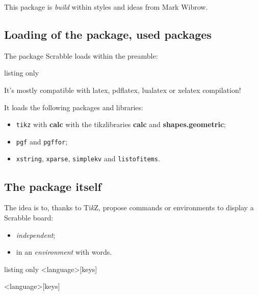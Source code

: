 \documentclass{article}
\newcommand\tikzlogo{Ti\textit{k}Z}
\let\TikZ\tikzlogo
\newcommand\Cle[1]{{\bfseries\sffamily\textlangle #1\textrangle}}
\begin{document}
\smallskip

This package is \textit{build} within styles and ideas from Mark Wibrow.

\subsection{Loading of the package, used packages}

The package \textsf{Scrabble} loads within the preamble:

\begin{PresentationCode}{listing only}
\usepackage{Scrabble}
\end{PresentationCode}

It's mostly compatible with \textsf{latex}, \textsf{pdflatex}, \textsf{lualatex} or \textsf{xelatex} compilation!

\medskip

It loads the following packages and libraries:

\begin{itemize}
	\item \texttt{tikz} with \Cle{calc} with the tikzlibraries \Cle{calc} and \Cle{shapes.geometric};
	\item \texttt{pgf} and \texttt{pgffor};
	\item \texttt{xstring}, \texttt{xparse}, \texttt{simplekv} and \texttt{listofitems}.
\end{itemize}

\subsection{The package itself}

The idea is to, thanks to \TikZ, propose commands or environments to display a Scrabble\texttrademark{} board:

\begin{itemize}
	\item \textit{independent};
	\item in an \textit{environment} with words.
\end{itemize}

\begin{PresentationCode}{listing only}
\ScrabbleBoard<language>[keys]

\begin{EnvScrabble}<language>[keys]
\end{EnvScrabble}
\end{PresentationCode}
\end{document}
